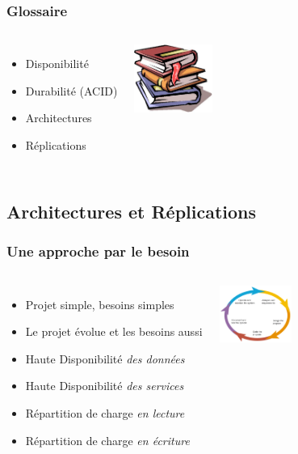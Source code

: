 \documentclass[english]{beamer}
\begin{document}
\begin{frame}
  \frametitle{Glossaire}
  
  \linebreak
  \linebreak

\begin{columns}[c]

  \begin{itemize}
    \item<3,4,6> Disponibilité 
    \item<2,6> Durabilité (ACI\alert{D})
    \item<5,6> Architectures
    \item<1,6> Réplications
  \end{itemize}  

\includegraphics[height=6em]{glossaire.jpg}
\end{columns}
\end{frame}

\subsection{Architectures et Réplications}

\begin{frame}[fragile]
  \frametitle{Une approche par le besoin}

  \linebreak

\begin{columns}[c]

\begin{itemize}
  \item<1-> Projet simple, besoins simples
  \item<1-> Le projet évolue et les besoins aussi
  \item<2-> Haute Disponibilité \textit{des données}
  \item<2-> Haute Disponibilité \textit{des services}
  \item<3-> Répartition de charge \textit{en lecture}
  \item<3-> Répartition de charge \textit{en écriture}
\end{itemize}

\includegraphics[height=5em]{development_life_cycle.png}
\end{columns}
\end{frame}
\end{document}
